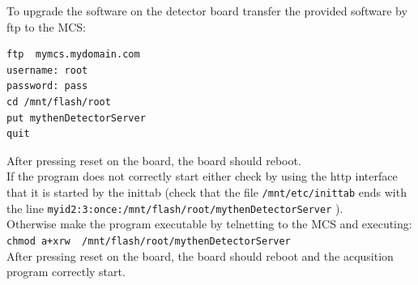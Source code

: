\documentclass{article}
\begin{document}
To upgrade the software on the detector board transfer the provided software by ftp to the MCS:
\begin{verbatim}
ftp  mymcs.mydomain.com
username: root
password: pass
cd /mnt/flash/root
put mythenDetectorServer
quit
\end{verbatim}

After pressing reset on the board, the board should reboot.\\

If the program does not correctly start either check by using the http interface that it is started by the inittab (check that the file \verb=/mnt/etc/inittab= ends with the line \verb=myid2:3:once:/mnt/flash/root/mythenDetectorServer= ). \\

Otherwise make the program executable by telnetting to the MCS and executing:
\verb=chmod a+xrw  /mnt/flash/root/mythenDetectorServer=\\

After pressing reset on the board, the board should reboot and the acqusition program correctly start.
\end{document}
